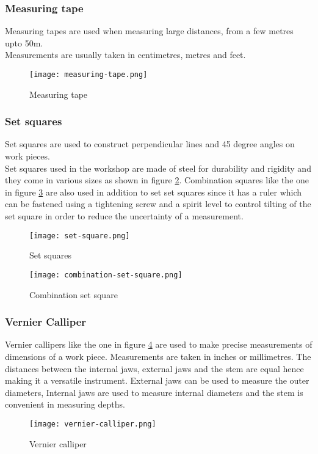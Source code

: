 \documentclass[a4paper,12pt]{article}
\begin{document}
				\subsubsection*{Measuring tape}
					Measuring tapes are used when measuring large distances, from a few metres upto 50m.\\
					Measurements are usually taken in centimetres, metres and feet. 
						\begin{figure}[H]
							\centering				
								\texttt{[image: measuring-tape.png]}
							\caption{Measuring tape}
							\label{fig:measuring-tape}
						\end{figure}
						
				\subsubsection*{Set squares}
					Set squares are used to construct perpendicular lines and 45 degree angles on work pieces.\\
					Set squares used in the workshop are made of steel for durability and rigidity and they come in various sizes as shown in figure \ref{fig:set-squares}.
					Combination squares like the one in figure \ref{fig:combination-set-square} are also used in addition to set set squares since it has a ruler which can be fastened using a tightening screw and a spirit level to control tilting of the set square in order to reduce the uncertainty of a measurement.
					
						\begin{figure}[H]
							\centering				
							\texttt{[image: set-square.png]}	
							\caption{Set squares}
							\label{fig:set-squares}
						\end{figure}
						
						\begin{figure}[H]
							\centering				
								\texttt{[image: combination-set-square.png]}
							\caption{Combination set square}
							\label{fig:combination-set-square}
						\end{figure}
						
				\subsubsection*{Vernier Calliper}
					Vernier callipers like the one in figure \ref{fig:vernier-calliper} are used to make precise measurements of dimensions of a work piece.
					Measurements are taken in inches or millimetres.
					The distances between the internal jaws, external jaws and the stem are equal hence making it a versatile instrument.
					External jaws can be used to measure the outer diameters,
					Internal jaws are used to measure internal diameters and the stem  is convenient in measuring depths. 
						\begin{figure}[H]
							\centering				
							\texttt{[image: vernier-calliper.png]}
							\caption{Vernier calliper}
							\label{fig:vernier-calliper}
						\end{figure}
						
\end{document}
